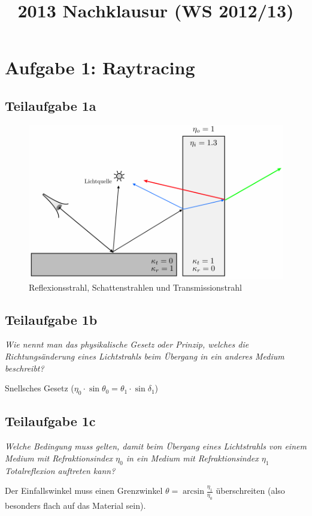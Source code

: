 \documentclass[a4paper]{scrartcl}
\begin{document}
\title{2013 Nachklausur (WS 2012/13)}

\setcounter{section}{1}
\section*{Aufgabe 1: Raytracing}
\subsection*{Teilaufgabe 1a}
\begin{figure}[h]
    \centering
    \includegraphics*[width=0.8\linewidth, keepaspectratio]{1a.png}
    \caption{Reflexionsstrahl, Schattenstrahlen und Transmissionstrahl}
    \label{fig:1a}
\end{figure}

\subsection*{Teilaufgabe 1b}
\textit{Wie nennt man das physikalische Gesetz oder Prinzip, welches die Richtungsänderung
eines Lichtstrahls beim Übergang in ein anderes Medium beschreibt?}

Snellsches Gesetz ($\eta_0 \cdot \sin \theta_0 = \theta_1 \cdot \sin \delta_1$)

\subsection*{Teilaufgabe 1c}
\textit{Welche Bedingung muss gelten, damit beim Übergang eines Lichtstrahls
von einem Medium mit Refraktionsindex $\eta_0$ in ein Medium mit
Refraktionsindex $\eta_1$ Totalreflexion auftreten kann?}

Der Einfallswinkel muss einen Grenzwinkel
$\theta = \arcsin \frac{\eta_1}{\eta_0}$
überschreiten (also besonders flach auf das Material sein).
\end{document}
